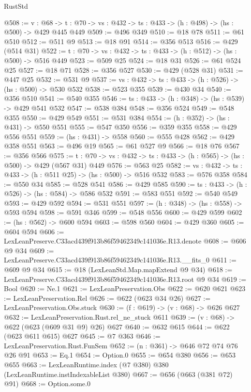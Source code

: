 \begin{lexlean}{RustStd}
\begin{coremodule}
@508 := {v : @68} ->
  {t : @70} -> {vs : @432} -> {ts : @433} -> (h : @498) -> (hs : @500) -> @429 @445 @449
@509 := @496 @349
@510 := @18 @78
@511 := @61 @510
@512 := @511 @9
@513 := @18 @91
@514 := @356 @513
@516 := @429 (@514 @31)
@522 := {t : @70} -> {vs : @432} -> {ts : @433} -> (h : @512) -> (hs : @500) -> @516 @449
@523 := @509 @25
@524 := @18 @31
@526 := @61 @524 @25
@527 := @18 @71
@528 := @356 @527
@530 := @429 (@528 @31)
@531 := @447 @25
@532 := @531 @9
@537 := {vs : @432} -> {ts : @433} -> (h : @526) -> (hs : @500) -> @530 @532
@538 := @523 @355
@539 := @430 @34
@540 := @356 @510
@541 := @540 @355
@546 := {ts : @433} -> (h : @348) -> (hs : @539) -> @429 @541 @532
@547 := @538 @384
@548 := @356 @524
@549 := @548 @355
@550 := @429 @549
@551 := @531 @384
@554 := (h : @352) -> (hs : @431) -> @550 @551
@555 := @547 @350
@556 := @359 @355
@558 := @429 @556 @551
@559 := (hs : @431) -> @558
@560 := @555 @428
@562 := @429 @358 @551
@563 := @496 @19
@565 := @61 @527 @9
@566 := @18 @76
@567 := @356 @566
@575 := {t : @70} -> {vs : @432} -> {ts : @433} -> (h : @565) -> (hs : @500) -> @429 (@567 @31) @449
@576 := @563 @25
@582 := {vs : @432} -> {ts : @433} -> (h : @511 @25) -> (hs : @500) -> @516 @532
@583 := @576 @358
@584 := @550 @34
@585 := @528 @541
@586 := @429 @585
@590 := {ts : @433} -> (h : @526) -> (hs : @584) -> @586 @532
@591 := @583 @551
@592 := @540 @549
@593 := @429 @592
@594 := @531 @551
@597 := (h : @348) -> (hs : @558) -> @593 @594
@598 := @591 @346
@599 := @548 @556
@600 := @429 @599
@602 := (hs : @562) -> @600 @594
@603 := @598 @560
@604 := @429 @360
@605 := @604 @594
@606 := LexLeanPreserve.C33acd439f913b86f59462349c141036e.R13.denote
@608 := @606 @9 @34
@609 := LexLeanPreserve.C33acd439f913b86f59462349c141036e.R13.__fits_0
@611 := @609 @9 @34
@615 := @18 (LexLeanStd.Map.mapExtend @9 @34)
@618 := LexLeanPreserve.C33acd439f913b86f59462349c141036e.R13.root @9 @34
@619 := Bool
@620 := Ne.{1}
@621 := LexLeanPreservation.Obs
@622 := @620 @621
@623 := LexLeanPreservation.Rel
@626 := @622 (@623 @34 @26)
@627 := LexLeanPreservation.Obs.stuck
@630 := (f : @619) -> (v : @68) -> @626 @627
@632 := LexLeanPreservation.Rust.rel_ne_stuck @611
@639 := (v : @68) -> @622 (@623 (@609 @31 @9) @26) @627
@640 := @632 @615
@644 := @622 (@623 @611 @615) @627
@645 := @7 @363
@646 := LexLeanPreservation.Rust.FunSem
@652 := (n : @361) -> @646 @72 @74 @76 @26 @91
@653 := Eq.{1}
@654 := Option.{0}
@655 := @654 @380
@656 := @653 @655
@663 := LexLeanRuntime.index (@7 @380) @380 (LexLeanRuntime.instIndexableList @380)
@667 := @656 (@663 (@381 @72) @91)
@668 := Option.some.{0}

\end{coremodule}
\end{lexlean}
